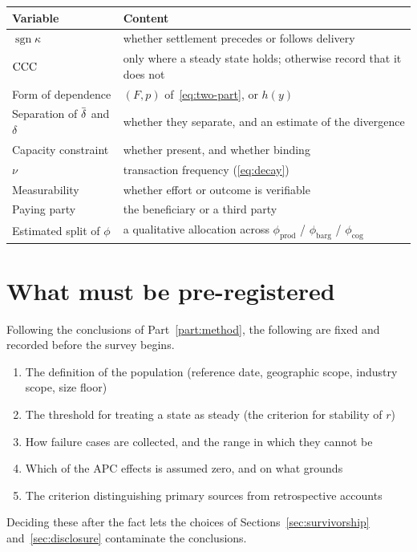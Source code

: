 \begin{center}
\begin{tabularx}{\textwidth}{@{}lX@{}}
\toprule
Variable & Content \\
\midrule
$\operatorname{sgn}\kappa$ & whether settlement precedes or follows delivery \\
$\mathrm{CCC}$ & only where a steady state holds; otherwise record that it does not \\
Form of dependence & $(F,p)$ of~\eqref{eq:two-part}, or $h(y)$ \\
Separation of $\dbar$ and $\delta$ & whether they separate, and an estimate of the divergence \\
Capacity constraint & whether present, and whether binding \\
$\nu$ & transaction frequency (\eqref{eq:decay}) \\
Measurability & whether effort or outcome is verifiable \\
Paying party & the beneficiary or a third party \\
Estimated split of $\phi$ & a qualitative allocation across $\phi_{\mathrm{prod}}$ / $\phi_{\mathrm{barg}}$ / $\phi_{\mathrm{cog}}$ \\
\bottomrule
\end{tabularx}
\label{tab:variables-to-record}
\end{center}

\section{What must be pre-registered}

Following the conclusions of Part~\ref{part:method}, the following are fixed and recorded
before the survey begins.

\begin{enumerate}[label=(\arabic*)]
\item The definition of the population (reference date, geographic scope, industry scope, size floor)
\item The threshold for treating a state as steady (the criterion for stability of $r$)
\item How failure cases are collected, and the range in which they cannot be
\item Which of the APC effects is assumed zero, and on what grounds
\item The criterion distinguishing primary sources from retrospective accounts
\end{enumerate}

Deciding these after the fact lets the choices of Sections~\ref{sec:survivorship}
and~\ref{sec:disclosure} contaminate the conclusions.
